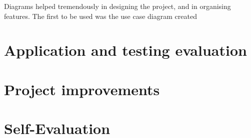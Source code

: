 Diagrams helped tremendously in designing the project, and in organising features. The first to be used was the use case diagram created 


\section{Application and testing evaluation}

\section{Project improvements}

\section{Self-Evaluation}





